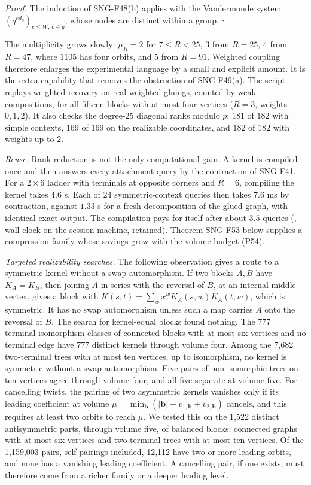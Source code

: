 \documentclass[
  11pt,
  a4paper,
]{report}
\let\singularitytexttt\texttt
\renewcommand{\texttt}[1]{\singularitytexttt{\seqsplit{#1}}}
\begin{document}
\emph{Proof.} The induction of SNG-F48(b) applies with the Vandermonde
system \((q^{ed_o})_{e\le W,\,o\in g}\), whose nodes are distinct within
a group. \(\square\)

The multiplicity grows slowly: \(\mu_R=2\) for \(7\le R<25\), \(3\) from
\(R=25\), \(4\) from \(R=47\), where \(1105\) has four orbits, and \(5\)
from \(R=91\). Weighted coupling therefore enlarges the experimental
language by a small and explicit amount. It is the extra capability that
removes the obstruction of SNG-F49(a). The script replays weighted
recovery on real weighted gluings, counted by weak compositions, for all
fifteen blocks with at most four vertices (\(R=3\), weights \(0,1,2\)).
It also checks the degree-25 diagonal ranks modulo \(p\): \(181\) of
\(182\) with simple contexts, \(169\) of \(169\) on the realizable
coordinates, and \(182\) of \(182\) with weights up to \(2\).

\emph{Reuse.} Rank reduction is not the only computational gain. A
kernel is compiled once and then answers every attachment query by the
contraction of SNG-F41. For a \(2\times6\) ladder with terminals at
opposite corners and \(R=6\), compiling the kernel takes \(4.6\) s. Each
of \(24\) symmetric-context queries then takes \(7.6\) ms by
contraction, against \(1.33\) s for a fresh decomposition of the glued
graph, with identical exact output. The compilation pays for itself
after about \(3.5\) queries (\texttt{-\/-benchmark}, wall-clock on the
session machine, retained). Theorem SNG-F53 below supplies a compression
family whose savings grow with the volume budget (P54).

\emph{Targeted realizability searches.} The following observation gives
a route to a symmetric kernel without a swap automorphism. If two blocks
\(A,B\) have \(K_A=K_B\), then joining \(A\) in series with the reversal
of \(B\), at an internal middle vertex, gives a block with
\(K(s,t)=\sum_wx^wK_A(s,w)K_A(t,w)\), which is symmetric. It has no swap
automorphism unless such a map carries \(A\) onto the reversal of \(B\).
The search for kernel-equal blocks found nothing. The 777
terminal-isomorphism classes of connected blocks with at most six
vertices and no terminal edge have 777 distinct kernels through volume
four. Among the 7,682 two-terminal trees with at most ten vertices, up
to isomorphism, no kernel is symmetric without a swap automorphism. Five
pairs of non-isomorphic trees on ten vertices agree through volume four,
and all five separate at volume five. For cancelling twists, the pairing
of two asymmetric kernels vanishes only if its leading coefficient at
volume
\(\mu=\min_{\mathbf b}(|\mathbf b|+v_{1,\mathbf b}+v_{2,\mathbf b})\)
cancels, and this requires at least two orbits to reach \(\mu\). We
tested this on the 1,522 distinct antisymmetric parts, through volume
five, of balanced blocks: connected graphs with at most six vertices and
two-terminal trees with at most ten vertices. Of the 1,159,003 pairs,
self-pairings included, 12,112 have two or more leading orbits, and none
has a vanishing leading coefficient. A cancelling pair, if one exists,
must therefore come from a richer family or a deeper leading level.
\end{document}
